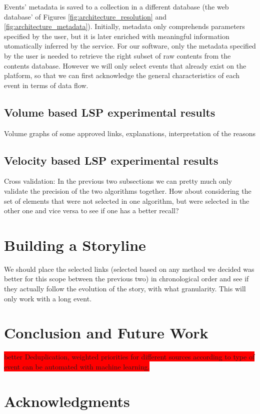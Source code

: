 \documentclass{sig-alternate}
\newcommand{\todo}[1]{\colorbox{red}{#1}}
\begin{document}
Events' metadata is saved to a collection in a different database (the web database' of Figures \ref{fig:architecture_resolution} and \ref{fig:architecture_metadata}). Initially, metadata only comprehends parameters specified by the user, but it is later enriched with meaningful information utomatically inferred by the service. For our software, only the metadata specified by the user is needed to retrieve the right subset of raw contents from the contents database. However we will only select events that already exist on the platform, so that we can first acknowledge the general characteristics of each event in terms of data flow.

\subsection{Volume based LSP experimental results}
\label{sec:volumeResults}

Volume graphs of some approved links, explanations, interpretation of the reasons

\subsection{Velocity based LSP experimental results}
\label{sec:velocityResults}

Cross validation: In the previous two subsections we can pretty much only validate the precision of the two algorithms together. How about considering the set of elements that were not selected in one algorithm, but were selected in the other one and vice versa to see if one has a better recall?


\section{Building a Storyline}
\label{sec:storyline}
We should place the selected links (selected based on any method we decided was better for this scope between the previous two) in chronological order and see if they actually follow the evolution of the story, with what granularity. This will only work with a long event.



\section{Conclusion and Future Work}
\label{sec:conclusions}
\todo{better Deduplication, weighted priorities for different sources according to type of event can be automated with machine learning.}

\section{Acknowledgments}
\label{sec:ack}

\nocite{*}


\balancecolumns
\end{document}
